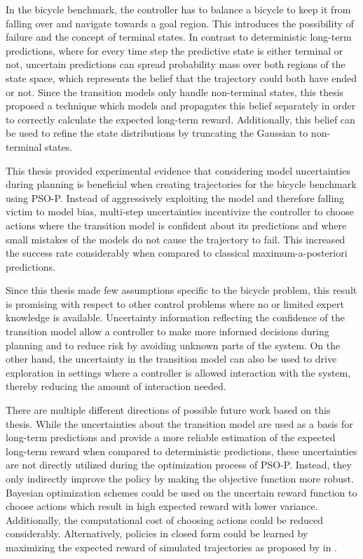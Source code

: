 In the bicycle benchmark, the controller has to balance a bicycle to keep it from falling over and navigate towards a goal region.
This introduces the possibility of failure and the concept of terminal states.
In contrast to deterministic long-term predictions, where for every time step the predictive state is either terminal or not, uncertain predictions can spread probability mass over both regions of the state space, which represents the belief that the trajectory could both have ended or not.
Since the transition models only handle non-terminal states, this thesis proposed a technique which models and propagates this belief separately in order to correctly calculate the expected long-term reward.
Additionally, this belief can be used to refine the state distributions by truncating the Gaussian to non-terminal states.

This thesis provided experimental evidence that considering model uncertainties during planning is beneficial when creating trajectories for the bicycle benchmark using PSO-P.
Instead of aggressively exploiting the model and therefore falling victim to model bias, multi-step uncertainties incentivize the controller to choose actions where the transition model is confident about its predictions and where small mistakes of the models do not cause the trajectory to fail.
This increased the success rate considerably when compared to classical maximum-a-posteriori predictions.

Since this thesis made few assumptions specific to the bicycle problem, this result is promising with respect to other control problems where no or limited expert knowledge is available.
Uncertainty information reflecting the confidence of the transition model allow a controller to make more informed decisions during planning and to reduce risk by avoiding unknown parts of the system.
On the other hand, the uncertainty in the transition model can also be used to drive exploration in settings where a controller is allowed interaction with the system, thereby reducing the amount of interaction needed.

There are multiple different directions of possible future work based on this thesis.
While the uncertainties about the transition model are used as a basis for long-term predictions and provide a more reliable estimation of the expected long-term reward when compared to deterministic predictions, these uncertainties are not directly utilized during the optimization process of PSO-P.
Instead, they only indirectly improve the policy by making the objective function more robust.
Bayesian optimization schemes \cite{brochu_tutorial_2010} could be used on the uncertain reward function to choose actions which result in high expected reward with lower variance.
Additionally, the computational cost of choosing actions could be reduced considerably.
Alternatively, policies in closed form could be learned by maximizing the expected reward of simulated trajectories as proposed by \citeauthor{deisenroth_efficient_2010} in \cite{deisenroth_efficient_2010}.

